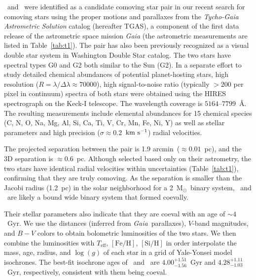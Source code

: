 \documentclass[12pt,letterpaper,margin=1in]{article}
\newcommand{\project}[1]{\textsl{#1}}
\newcommand{\acronym}[1]{{\small{#1}}}
\newcommand{\gaia}{\project{Gaia}}
\newcommand{\tgas}{\acronym{TGAS}}
\newcommand*\elem[1]{\ensuremath{\mathrm{#1}}}
\newcommand*\elemH[1]{\ensuremath{[\mathrm{#1}/\elem{H}]}}
\newcommand{\sunanalog}{\text{Krios}}
\newcommand{\bizarreone}{\text{Kronos}}
\newcommand{\kms}{\ensuremath{\rm km~s^{-1}}}
\newcommand{\msun}{\ensuremath{{\mathrm M}_\odot}}
\renewcommand\tablename{Table}
\begin{document}
\sunanalog\ and \bizarreone\ were identified as a candidate comoving star pair
in our recent search for comoving stars using the proper motions and parallaxes
from the {\it Tycho-Gaia Astrometric Solution} catalog (hereafter \tgas), a
component of the first data release of the astrometric space mission \gaia\cite{2016A&A...595A...2G}
(the astrometric measurements are listed in \tablename~\ref{tab:t1}).
The pair has also been previously recognized as a visual double star system
in Washington Double Star catalog\cite{2001AJ....122.3466M}.
The two stars have spectral types G0 and G2 both similar to the Sun (G2).
In a separate effort to study detailed chemical abundances of potential
planet-hosting stars, high resolution ($R=\lambda/\Delta\lambda\approx 70000$),
high signal-to-noise ratio (typically $>200$ per pixel in continuum) spectra of
both stars were obtained using the HIRES spectrograph on the Keck-I
telescope\cite{2016ApJS..225...32B}. 
The wavelength coverage is $5164$--$7799$~\AA.
The resulting measurements include elemental abundances for 15 chemical species
(C, N, O, Na, Mg, Al, Si, Ca, Ti, V, Cr, Mn, Fe, Ni, Y) as well as stellar
parameters and high precision ($\sigma\approx0.2$~\kms) radial velocities.

The projected separation between the pair is 1.9 arcmin\ ($\approx 0.01$~pc),
and the 3D separation is $\approx 0.6$~pc.
Although selected based only on their astrometry, the two stars
have identical radial velocities within uncertainties (Table~\ref{tab:t1}),
confirming that they are truly comoving.
As the separation is smaller than the Jacobi radius (1.2~pc) in the solar
neighborhood for a 2~\msun\ binary system\cite{Jiang:2010aa}, \bizarreone\ and
\sunanalog\ are likely a bound wide binary system that formed coevally.

Their stellar parameters also indicate that they are coeval with an age of $\sim 4$~Gyr.
We use the distances (inferred from \gaia\ parallaxes), $V$-band magnitudes,
and $B-V$ colors to obtain bolometric luminosities of the two stars\cite{2003AJ....126..778V}.
We then combine the luminosities with $T_\mathrm{eff}$, \elemH{Fe}, \elemH{Si}
in order interpolate the mass, age, radius, and $\log(g)$ of each star
in a grid of Yale-Yonsei model isochrones\cite{2013ApJ...776...87S}.
The best-fit isochrone ages of \sunanalog\ and \bizarreone\ are
$4.00_{-1.56}^{+1.51}$~Gyr and $4.28_{-1.03}^{+1.11}$~Gyr, respectively,
consistent with them being coeval.
\end{document}
